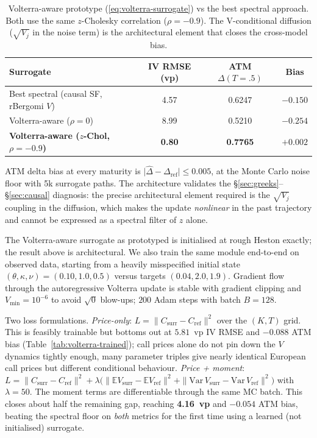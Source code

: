 \documentclass[11pt,a4paper]{article}
\begin{document}
\begin{table}[h]
\centering
\caption{Volterra-aware prototype (\ref{eq:volterra-surrogate}) vs the
best spectral approach. Both use the same $z$-Cholesky correlation
($\rho=-0.9$). The V-conditional diffusion ($\sqrt{V_j}$ in the noise
term) is the architectural element that closes the cross-model bias.}
\label{tab:volterra-prototype}
\begin{tabular}{lccc}
\toprule
Surrogate & IV RMSE (vp) & ATM $\Delta(T=.5)$ & Bias \\
\midrule
Best spectral (causal SF, rBergomi $V$)  & 4.57 & 0.6247 & $-0.150$ \\
Volterra-aware ($\rho=0$)         & 8.99 & 0.5210 & $-0.254$ \\
\textbf{Volterra-aware ($z$-Chol, $\rho=-0.9$)} & \textbf{0.80} & \textbf{0.7765} & \textbf{$+0.002$} \\
\bottomrule
\end{tabular}
\end{table}

ATM delta bias at every maturity is $\lvert\hat\Delta - \Delta_{\mathrm{ref}}\rvert
\leq 0.005$, at the Monte Carlo noise floor with 5k surrogate paths.
The architecture validates the §\ref{sec:greeks}--§\ref{sec:causal}
diagnosis: the precise architectural element required is the
$\sqrt{V_j}$ coupling in the diffusion, which makes the update
\emph{nonlinear} in the past trajectory and cannot be expressed as a
spectral filter of $z$ alone.

\medskip

The Volterra-aware surrogate as prototyped is initialised at rough
Heston exactly; the result above is architectural. We also train the
same module end-to-end on observed data, starting from a heavily
misspecified initial state $(\theta, \kappa, \nu) = (0.10, 1.0, 0.5)$
versus targets $(0.04, 2.0, 1.9)$. Gradient flow through the
autoregressive Volterra update is stable with gradient clipping and
$V_{\min} = 10^{-6}$ to avoid $\sqrt{0}$ blow-ups; $200$ Adam steps
with batch $B = 128$.

Two loss formulations. \emph{Price-only}: $L = \|C_{\mathrm{surr}}
- C_{\mathrm{ref}}\|^2$ over the $(K, T)$ grid. This is feasibly
trainable but bottoms out at $5.81$~vp IV RMSE and $-0.088$ ATM bias
(Table~\ref{tab:volterra-trained}); call prices alone do not pin down
the $V$ dynamics tightly enough, many parameter triples give nearly
identical European call prices but different conditional behaviour.
\emph{Price + moment}: $L = \|C_{\mathrm{surr}} - C_{\mathrm{ref}}\|^2
+ \lambda \bigl( \|\mathbb{E}V_{\mathrm{surr}} - \mathbb{E}V_{\mathrm{ref}}\|^2
+ \|\mathrm{Var}\,V_{\mathrm{surr}} - \mathrm{Var}\,V_{\mathrm{ref}}\|^2 \bigr)$
with $\lambda = 50$. The moment terms are differentiable through the
same MC batch. This closes about half the remaining gap, reaching
\textbf{4.16~vp} and \textbf{$-0.054$} ATM bias, beating the spectral
floor on \emph{both} metrics for the first time using a learned
(not initialised) surrogate.
\end{document}
